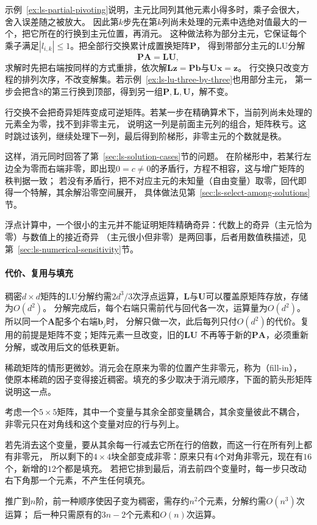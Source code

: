 示例~\ref{ex:ls-partial-pivoting}说明，主元比同列其他元素小得多时，乘子会很大，舍入误差随之被放大。
因此第$k$步先在第$k$列尚未处理的元素中选绝对值最大的一个，把它所在的行换到主元位置，再消元。
这种做法称为部分主元，它保证每个乘子满足$|l_{i,k}|\leq1$。把全部行交换累计成置换矩阵$\bm P$，
得到带部分主元的LU分解
\begin{equation}
 \bm P\bm A=\bm L\bm U,
 \label{eq:matrix-analysis-palu}
\end{equation}
求解时先把右端按同样的方式重排，依次解$\bm L\bm z=\bm P\bm b$与$\bm U\bm x=\bm z$。
行交换只改变方程的排列次序，不改变解集。若示例~\ref{ex:ls-lu-three-by-three}也用部分主元，
第一步会把含$8$的第三行换到顶部，得到另一组$\bm P,\bm L,\bm U$，解不变。

行交换不会把奇异矩阵变成可逆矩阵。若某一步在精确算术下，当前列尚未处理的元素全为零，找不到非零主元，
说明这一列是前面主元列的组合，矩阵秩亏。这时跳过该列，继续处理下一列，最后得到阶梯形，非零主元的个数就是秩。

这样，消元同时回答了第~\ref{sec:ls-solution-cases}节的问题。
在阶梯形中，若某行左边全为零而右端非零，即出现$0=c\neq0$的矛盾行，方程不相容，这与增广矩阵的秩判据一致；
若没有矛盾行，把不对应主元的未知量（自由变量）取零，回代即得一个特解，其余解沿零空间展开，
具体做法见第~\ref{sec:ls-select-among-solutions}节。

浮点计算中，一个很小的主元并不能证明矩阵精确奇异：代数上的奇异（主元恰为零）与数值上的接近奇异
（主元很小但非零）是两回事，后者用数值秩描述，见第~\ref{sec:ls-numerical-sensitivity}节。

\paragraph{代价、复用与填充}

稠密$d\times d$矩阵的LU分解约需$2d^3/3$次浮点运算，$\bm L$与$\bm U$可以覆盖原矩阵存放，存储为$O(d^2)$。
分解完成后，每个右端只需前代与回代各一次，运算量为$O(d^2)$。所以同一个$\bm A$配多个右端$\bm b_j$时，
分解只做一次，此后每列只付$O(d^2)$的代价。复用的前提是矩阵不变；矩阵元素一旦改变，旧的$\bm L\bm U$
不再等于新的$\bm P\bm A$，必须重新分解，或改用后文的低秩更新。

稀疏矩阵的情形更微妙。消元会在原来为零的位置产生非零元，称为（fill-in），
使原本稀疏的因子变得接近稠密。填充的多少取决于消元顺序，下面的箭头形矩阵说明这一点。

\begin{example}[箭头形矩阵的填充]
\label{ex:ls-arrow-fill-in}
考虑一个$5\times5$矩阵，其中一个变量与其余全部变量耦合，其余变量彼此不耦合，
非零元只在对角线和这个变量对应的行与列上。

若先消去这个变量，要从其余每一行减去它所在行的倍数，而这一行在所有列上都有非零元，
所以剩下的$4\times4$块全部变成非零：原来只有$4$个对角非零元，现在有$16$个，新增的$12$个都是填充。
若把它排到最后，消去前四个变量时，每一步只改动右下角那一个元素，不产生任何填充。

推广到$n$阶，前一种顺序使因子变为稠密，需存约$n^2$个元素，分解约需$O(n^3)$次运算；
后一种只需原有的$3n-2$个元素和$O(n)$次运算。
\end{example}

